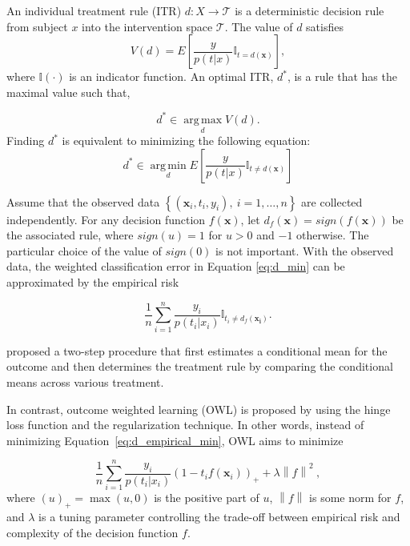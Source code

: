 \documentclass{article}
\begin{document}
An individual treatment rule (ITR) $d: X \rightarrow \mathcal{T}$ is a deterministic decision
rule from subject $x$ into the intervention space $\mathcal{T}$. The
value of $d$ satisfies
$$V(d) = E \left [ \frac{y}{p(t|x)}\mathbb{I}_{t=d(\mathbf{x})}\right
],$$
where $\mathbb{I}(\cdot)$ is an indicator function. An optimal ITR, $d^{*}$, is a rule that has the maximal value such
that,

$$d^{*} \in \operatorname*{arg\,max}_d V(d).$$
Finding $d^{*}$ is equivalent to minimizing the following equation:
\begin{equation} \label{eq:d_min}
d^{*} \in \operatorname*{arg\,min}_d E \left [
  \frac{y}{p(t|x)}\mathbb{I}_{t \neq d(\mathbf{x})}\right
]
\end{equation}

Assume that the observed data $\left \{
  (\mathbf{x}_i,t_i,y_i),~i=1,\ldots , n \right \}$ are collected
independently. For any decision function $f(\mathbf{x})$, let
$d_f(\mathbf{x}) = sign(f(\mathbf{x}))$ be the associated rule, where
$sign(u) = 1$ for $u > 0$ and $-1$ otherwise. The particular choice of
the value of $sign(0)$ is not important. With the observed data, the
weighted classification error in Equation \ref{eq:d_min} can be approximated by
the empirical risk

\begin{equation} \label{eq:d_empirical_min}
  \frac{1}{n}\sum_{i=1}^{n}\frac{y_i}{p(t_i|x_i)}\mathbb{I}_{t_i \neq
    d_f(\mathbf{x_i})} .
\end{equation}

\cite{Qian2011-vz} proposed a two-step procedure that first estimates
a conditional mean for the outcome and then determines the treatment
rule by comparing the conditional means across various treatment.

In contrast, outcome weighted learning (OWL) is proposed by
\cite{zhao2012estimating} using the hinge loss function and the
regularization technique. In other words, instead of minimizing
Equation~\ref{eq:d_empirical_min}, OWL aims to minimize

\begin{equation}
  \frac{1}{n}\sum_{i=1}^{n}\frac{y_i}{p(t_i|x_i)}(1-t_if(\mathbf{x}_i))_{+}+\lambda\left
    \| f \right \|^2 ~\label{eq:d_owl_empirical_min},
\end{equation}
where $(u)_+=\max(u,0)$ is the positive part of $u$, $\left \| f
\right \|$ is some norm for $f$, and $\lambda$ is a tuning parameter
controlling the trade-off between empirical risk and complexity of the
decision function $f$.
\end{document}
